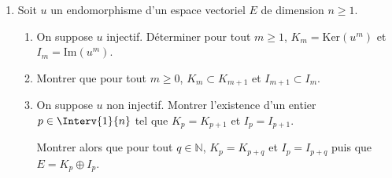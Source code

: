 \documentclass[a4paper,10pt]{report}
\begin{document}
\begin{Exa}
\begin{enumerate}
\item Soit $u$ un endomorphisme d'un espace vectoriel $E$ de dimension $n \geq 1$.
\begin{enumerate}
\item On suppose $u$ injectif. Déterminer pour tout $m \geq 1$, $K_m = \textrm{Ker}(u^m)$ et $I_m = \textrm{Im}(u^m)$.
\item Montrer que pour tout $m \geq 0$, $K_m \subset K_{m+1}$ et $I_{m+1} \subset I_m$.
\item On suppose $u$ non injectif. Montrer l'existence d'un entier $p \in \Interv{1}{n}$ tel que $K_p=K_{p+1}$ et $I_p = I_{p+1}$.

\noindent Montrer alors que pour tout $q \in \mathbb{N}$, $K_p = K_{p+q}$ et $I_p = I_{p+q}$ puis que $E = K_p \oplus I_p$.
\end{enumerate}
\end{enumerate}
\end{Exa} 
\end{document}
